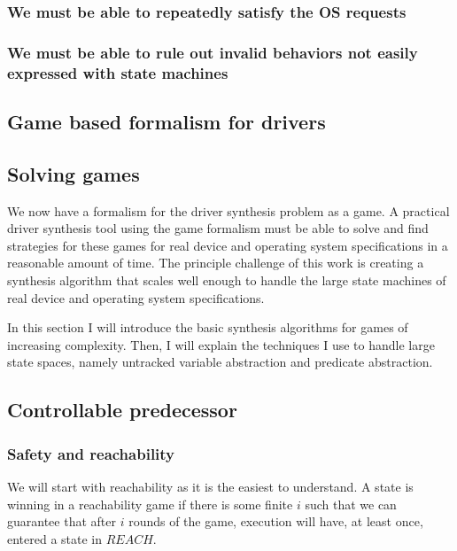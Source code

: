 \documentclass{article}
\begin{document}
\subsubsection{We must be able to repeatedly satisfy the OS requests}

\subsubsection{We must be able to rule out invalid behaviors not easily expressed with state machines}

\subsection{Game based formalism for drivers}

\subsection{Solving games}

We now have a formalism for the driver synthesis problem as a game. A practical driver synthesis tool using the game formalism must be able to solve and find strategies for these games for real device and operating system specifications in a reasonable amount of time. The principle challenge of this work is creating a synthesis algorithm that scales well enough to handle the large state machines of real device and operating system specifications. 

In this section I will introduce the basic synthesis algorithms for games of increasing complexity. Then, I will explain the techniques I use to handle large state spaces, namely untracked variable abstraction and predicate abstraction.

\subsection{Controllable predecessor}

\subsubsection{Safety and reachability}

We will start with reachability as it is the easiest to understand. A state is winning in a reachability game if there is some finite $i$ such that we can guarantee that after $i$ rounds of the game, execution will have, at least once, entered a state in $REACH$.
\end{document}
